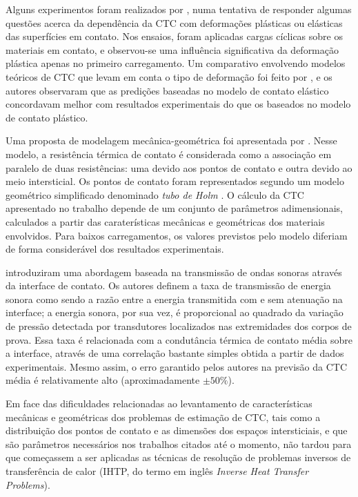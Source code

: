Alguns experimentos foram realizados por \cite{artigo_williamson}, numa tentativa de responder algumas questões acerca da dependência da CTC com
deformações plásticas ou elásticas das superfícies em contato. Nos ensaios, foram aplicadas cargas cíclicas sobre os materiais em contato, e observou-se
uma influência significativa da deformação plástica apenas no primeiro carregamento. Um comparativo envolvendo modelos teóricos de CTC que levam em conta
o tipo de deformação foi feito por \cite{artigo_mcwaid}, e os autores observaram que as predições baseadas
no modelo de contato elástico concordavam melhor com resultados experimentais do que os baseados no modelo de contato plástico. 

Uma proposta de modelagem mecânica-geométrica foi apresentada por \cite{artigo_salgon}. Nesse modelo, a resistência térmica de contato é considerada
como a associação em paralelo de duas resistências: uma devido aos pontos de contato e outra devido ao meio intersticial. Os pontos de contato foram
representados segundo um modelo geométrico simplificado denominado \textit{tubo de Holm} \citep{livro_holm}. O cálculo da CTC apresentado no trabalho
depende de um conjunto de parâmetros adimensionais, calculados a partir das caraterísticas mecânicas e geométricas dos materiais envolvidos. Para baixos carregamentos,
os valores previstos pelo modelo diferiam de forma considerável dos resultados experimentais.

\cite{artigo_tomimura} introduziram uma abordagem baseada na transmissão de ondas sonoras através da interface de contato. Os autores definem a
taxa de transmissão de energia sonora como sendo a razão entre a energia transmitida com e sem atenuação na interface; a energia sonora, por sua
vez, é proporcional ao quadrado da variação de pressão detectada por transdutores localizados nas extremidades dos corpos de prova.
Essa taxa é relacionada com a condutância térmica de contato média sobre a interface, através de uma correlação bastante simples obtida a partir de dados
experimentais. Mesmo assim, o erro garantido pelos autores na previsão da CTC média é relativamente alto (aproximadamente $\pm 50 \%$).

Em face das dificuldades relacionadas ao levantamento de características mecânicas e geométricas dos problemas de estimação de CTC, 
tais como a distribuição dos pontos de contato e as dimensões dos espaços intersticiais, e que são parâmetros necessários nos trabalhos citados
até o momento, não tardou para que começassem a ser aplicadas as técnicas de resolução de problemas inversos de transferência de calor (IHTP, do termo em inglês \textit{Inverse Heat Transfer Problems}).

